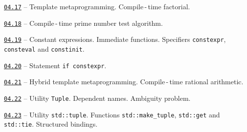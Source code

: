 \documentclass[a4paper,12pt]{article}
\renewenvironment{itemize}
{
    \begin{list}{\labelitemi}
    {
      \setlength{\topsep}{0pt}
      \setlength{\partopsep}{0pt}
      \setlength{\parskip}{0pt}
      \setlength{\itemsep}{0pt}
      \setlength{\parsep}{0pt}
      \setlength{\leftmargin}{14.5pt}
    }
}{\end{list}}
\begin{document}
\medskip\smallskip

\begin{itemize}

    \item \href{https://github.com/i-s-m-mipt/Education/blob/master/projects/examples/source/04.17.cpp}{\texttt{04.17}} -- Template metaprogramming. Compile\,-\,time factorial.

    \smallskip

    \item \href{https://github.com/i-s-m-mipt/Education/blob/master/projects/examples/source/04.18.cpp}{\texttt{04.18}} -- Compile\,-\,time prime number test algorithm.

    \smallskip

    \item \href{https://github.com/i-s-m-mipt/Education/blob/master/projects/examples/source/04.19.cpp}{\texttt{04.19}} -- Constant expressions. Immediate functions. Specifiers \lstinline{constexpr}, \lstinline{consteval} and \lstinline{constinit}.

    \smallskip

    \item \href{https://github.com/i-s-m-mipt/Education/blob/master/projects/examples/source/04.20.cpp}{\texttt{04.20}} -- Statement \lstinline{if constexpr}.

    \smallskip

    \item \href{https://github.com/i-s-m-mipt/Education/blob/master/projects/examples/source/04.21.cpp}{\texttt{04.21}} -- Hybrid template metaprogramming. Compile\,-\,time rational arithmetic.

    \smallskip

    \item \href{https://github.com/i-s-m-mipt/Education/blob/master/projects/examples/source/04.22.cpp}{\texttt{04.22}} -- Utility \lstinline{Tuple}. Dependent names. Ambiguity problem.

    \smallskip

    \item \href{https://github.com/i-s-m-mipt/Education/blob/master/projects/examples/source/04.23.cpp}{\texttt{04.23}} -- Utility \lstinline{std::tuple}. Functions \lstinline{std::make_tuple}, \lstinline{std::get} and \lstinline{std::tie}. Structured bindings.

\end{itemize}

\bigskip\medskip
\end{document}
